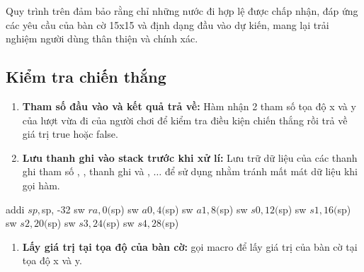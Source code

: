 Quy trình trên đảm bảo rằng chỉ những nước đi hợp lệ được chấp nhận, đáp ứng các yêu cầu của bàn cờ 15x15 và định dạng đầu vào dự kiến, mang lại trải nghiệm người dùng thân thiện và chính xác.

\subsection{Kiểm tra chiến thắng}

\begin{enumerate}
\item \textbf{Tham số đầu vào và kết quả trả về:} Hàm nhận 2 tham số tọa độ x và y của lượt vừa đi của người chơi để kiểm tra điều kiện chiến thắng rồi trả về giá trị true hoặc false.  
\item \textbf{Lưu thanh ghi vào stack trước khi xử lí:} Lưu trữ dữ liệu của các thanh ghi tham số , , thanh ghi  và , \(\dots\) để sử dụng nhằm tránh mất mát dữ liệu khi gọi hàm.
\end{enumerate}

\begin{code}
addi $sp, $sp, -32
sw $ra, 0($sp)
sw $a0, 4($sp)
sw $a1, 8($sp)
sw $s0, 12($sp)
sw $s1, 16($sp)
sw $s2, 20($sp)
sw $s3, 24($sp)
sw $s4, 28($sp)
\end{code}

\begin{enumerate}[resume] 
    \item \textbf{Lấy giá trị tại tọa độ của bàn cờ:} gọi macro  để lấy giá trị của bàn cờ tại tọa độ x và y.
\end{enumerate}


